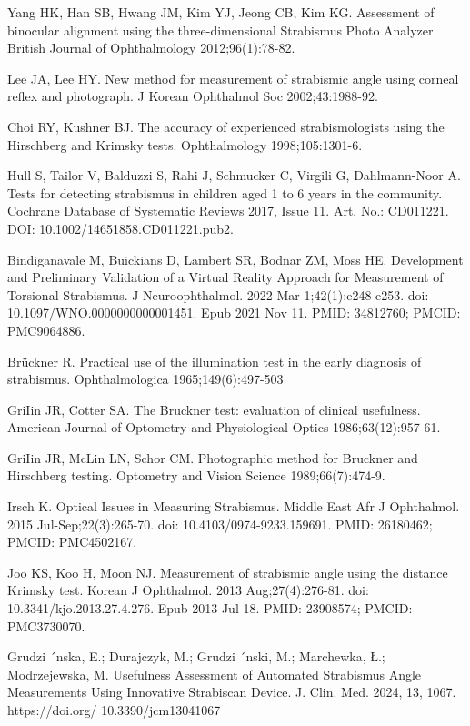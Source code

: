 \documentclass{article}
\begin{document}
\begin{thebibliography}{99}
Yang HK, Han SB, Hwang JM, Kim YJ, Jeong CB, Kim KG.
Assessment of binocular alignment using the three-dimensional
Strabismus Photo Analyzer. British Journal of Ophthalmology
2012;96(1):78-82.

Lee JA, Lee HY. New method for measurement of strabismic angle using corneal reflex and photograph. J Korean
Ophthalmol Soc 2002;43:1988-92.

Choi RY, Kushner BJ. The accuracy of experienced strabismologists using the Hirschberg and Krimsky tests. Ophthalmology 1998;105:1301-6.

Hull S, Tailor V, Balduzzi S, Rahi J, Schmucker C, Virgili G, Dahlmann-Noor A.
Tests for detecting strabismus in children aged 1 to 6 years in the community.
Cochrane Database of Systematic Reviews 2017, Issue 11. Art. No.: CD011221.
DOI: 10.1002/14651858.CD011221.pub2.

Bindiganavale M, Buickians D, Lambert SR, Bodnar ZM, Moss HE. Development and Preliminary Validation of a Virtual Reality Approach for Measurement of Torsional Strabismus. J Neuroophthalmol. 2022 Mar 1;42(1):e248-e253. doi: 10.1097/WNO.0000000000001451. Epub 2021 Nov 11. PMID: 34812760; PMCID: PMC9064886.

Brückner R. Practical use of the illumination test in the early
diagnosis of strabismus. Ophthalmologica 1965;149(6):497-503

GriIin JR, Cotter SA. The Bruckner test: evaluation of clinical
usefulness. American Journal of Optometry and Physiological
Optics 1986;63(12):957-61.

GriIin JR, McLin LN, Schor CM. Photographic method for
Bruckner and Hirschberg testing. Optometry and Vision Science
1989;66(7):474-9.

Irsch K. Optical Issues in Measuring Strabismus. Middle East Afr J Ophthalmol. 2015 Jul-Sep;22(3):265-70. doi: 10.4103/0974-9233.159691. PMID: 26180462; PMCID: PMC4502167.

Joo KS, Koo H, Moon NJ. Measurement of strabismic angle using the distance Krimsky test. Korean J Ophthalmol. 2013 Aug;27(4):276-81. doi: 10.3341/kjo.2013.27.4.276. Epub 2013 Jul 18. PMID: 23908574; PMCID: PMC3730070.



Grudzi ´nska, E.; Durajczyk,
M.; Grudzi ´nski, M.; Marchewka, Ł.;
Modrzejewska, M. Usefulness
Assessment of Automated Strabismus
Angle Measurements Using
Innovative Strabiscan Device. J. Clin.
Med. 2024, 13, 1067. https://doi.org/
10.3390/jcm13041067


\end{thebibliography}
\end{document}

